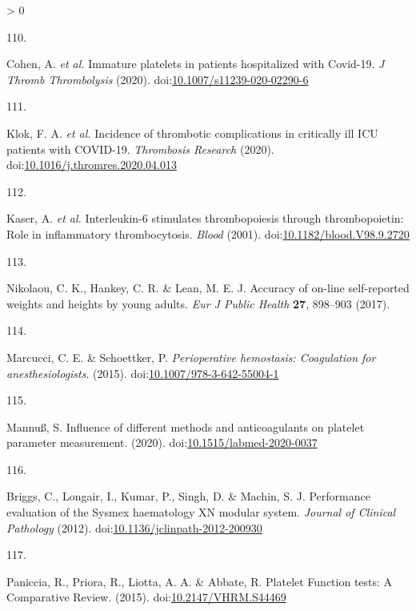 \documentclass[11pt,twoside]{bristolthesis}
\newlength{\cslhangindent}
\newlength{\csllabelwidth}
\newenvironment{CSLReferences}[2] %
 {%
  \setlength{\parindent}{0pt}
  \ifodd #1 \everypar{\setlength{\hangindent}{\cslhangindent}}\ignorespaces\fi
  \ifnum #2 > 0
  \setlength{\parskip}{#2\baselineskip}
  \fi
 }%
 {}
\newcommand{\CSLLeftMargin}[1]{\parbox[t]{\csllabelwidth}{#1}}
\newcommand{\CSLRightInline}[1]{\parbox[t]{\linewidth - \csllabelwidth}{#1}\break}
\begin{document}
\begin{CSLReferences}{0}{0}
\leavevmode\hypertarget{ref-Cohen2020}{}%
\CSLLeftMargin{110. }
\CSLRightInline{Cohen, A. \emph{et al.} {Immature platelets in patients hospitalized with Covid-19}. \emph{J Thromb Thrombolysis} (2020). doi:\href{https://doi.org/10.1007/s11239-020-02290-6}{10.1007/s11239-020-02290-6}}

\leavevmode\hypertarget{ref-Klok2020}{}%
\CSLLeftMargin{111. }
\CSLRightInline{Klok, F. A. \emph{et al.} {Incidence of thrombotic complications in critically ill ICU patients with COVID-19}. \emph{Thrombosis Research} (2020). doi:\href{https://doi.org/10.1016/j.thromres.2020.04.013}{10.1016/j.thromres.2020.04.013}}

\leavevmode\hypertarget{ref-Kaser2001}{}%
\CSLLeftMargin{112. }
\CSLRightInline{Kaser, A. \emph{et al.} {Interleukin-6 stimulates thrombopoiesis through thrombopoietin: Role in inflammatory thrombocytosis}. \emph{Blood} (2001). doi:\href{https://doi.org/10.1182/blood.V98.9.2720}{10.1182/blood.V98.9.2720}}

\leavevmode\hypertarget{ref-Nikolaou2017}{}%
\CSLLeftMargin{113. }
\CSLRightInline{Nikolaou, C. K., Hankey, C. R. \& Lean, M. E. J. {Accuracy of on-line self-reported weights and heights by young adults}. \emph{Eur J Public Health} \textbf{27}, 898--903 (2017).}

\leavevmode\hypertarget{ref-Marcucci2015}{}%
\CSLLeftMargin{114. }
\CSLRightInline{Marcucci, C. E. \& Schoettker, P. \emph{{Perioperative hemostasis: Coagulation for anesthesiologists}}. (2015). doi:\href{https://doi.org/10.1007/978-3-642-55004-1}{10.1007/978-3-642-55004-1}}

\leavevmode\hypertarget{ref-Mannuuxdf2020}{}%
\CSLLeftMargin{115. }
\CSLRightInline{Mannuß, S. {Influence of different methods and anticoagulants on platelet parameter measurement}. (2020). doi:\href{https://doi.org/10.1515/labmed-2020-0037}{10.1515/labmed-2020-0037}}

\leavevmode\hypertarget{ref-Briggs2012}{}%
\CSLLeftMargin{116. }
\CSLRightInline{Briggs, C., Longair, I., Kumar, P., Singh, D. \& Machin, S. J. {Performance evaluation of the Sysmex haematology XN modular system}. \emph{Journal of Clinical Pathology} (2012). doi:\href{https://doi.org/10.1136/jclinpath-2012-200930}{10.1136/jclinpath-2012-200930}}

\leavevmode\hypertarget{ref-Paniccia2015}{}%
\CSLLeftMargin{117. }
\CSLRightInline{Paniccia, R., Priora, R., Liotta, A. A. \& Abbate, R. {Platelet Function tests: A Comparative Review}. (2015). doi:\href{https://doi.org/10.2147/VHRM.S44469}{10.2147/VHRM.S44469}}


\end{CSLReferences}
\end{document}
